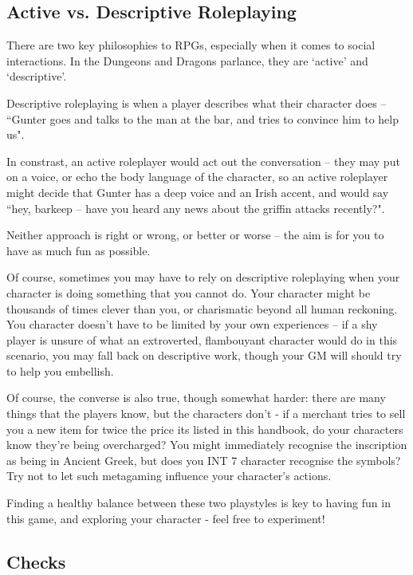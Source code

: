 \subsection{Active vs. Descriptive Roleplaying}

There are two key philosophies to RPGs, especially when it comes to social interactions. In the Dungeons and Dragons parlance, they are `active' and `descriptive'. 

Descriptive roleplaying is when a player describes what their character does -- ``Gunter goes and talks to the man at the bar, and tries to convince him to help us". 

In constrast, an active roleplayer would act out the conversation -- they may put on a voice, or echo the body language of the character, so an active roleplayer might decide that Gunter has a deep voice and an Irish accent, and would say ``hey, barkeep -- have you heard any news about the griffin attacks recently?". 

Neither approach is right or wrong, or better or worse -- the aim is for you to have as much fun as possible. 

Of course, sometimes you may have to rely on descriptive roleplaying when your character is doing something that you cannot do. Your character might be thousands of times clever than you, or charismatic beyond all human reckoning. You character doesn't have to be limited by your own experiences -- if a shy player is unsure of what an extroverted, flambouyant character would do in this scenario, you may fall back on descriptive work, though your GM will should try to help you embellish.

Of course, the converse is also true, though somewhat harder: there are many things that the players know, but the characters don't - if a merchant tries to sell you a new item for twice the price its listed in this handbook, do your characters know they're being overcharged? You might immediately recognise the inscription as being in Ancient Greek, but does you INT 7 character recognise the symbols? Try not to let such metagaming influence your character's actions. 

Finding a healthy balance between these two playstyles is key to having fun in this game, and exploring your character - feel free to experiment!

\subsection{Checks}

